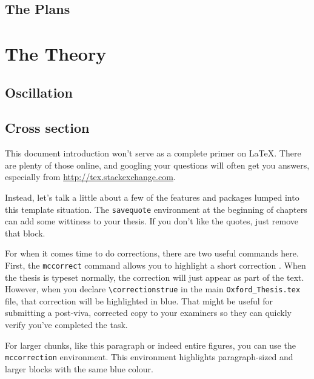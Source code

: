 \subsection{The Plans}

\section{The Theory}
\subsection{Oscillation}
\subsection{Cross section}

This document introduction won't serve as a complete primer on \LaTeX.  There are plenty of those online, and googling your questions will often get you answers, especially from \url{http://tex.stackexchange.com}.

Instead, let's talk a little about a few of the features and packages lumped into this template situation.  The \verb|savequote| environment at the beginning of chapters can add some wittiness to your thesis.  If you don't like the quotes, just remove that block.

For when it comes time to do corrections, there are two useful commands here.  First, the \verb|mccorrect| command allows you to highlight a short correction .  When the thesis is typeset normally, the correction will just appear as part of the text.  However, when you declare \verb|\correctionstrue| in the main \verb|Oxford_Thesis.tex| file, that correction will be highlighted in blue.  That might be useful for submitting a post-viva, corrected copy to your examiners so they can quickly verify you've completed the task.

\begin{mccorrection}
For larger chunks, like this paragraph or indeed entire figures, you can use the \verb|mccorrection| environment.  This environment highlights paragraph-sized and larger blocks with the same blue colour.
\end{mccorrection}
